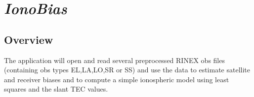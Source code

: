 %
%


\section{\emph{IonoBias}}
\subsection{Overview}
The application will open and read several preprocessed RINEX obs files
 (containing obs types EL,LA,LO,SR or SS) and use the data to estimate
 satellite and receiver biases and to compute a simple ionospheric model
 using least squares and the slant TEC values.

